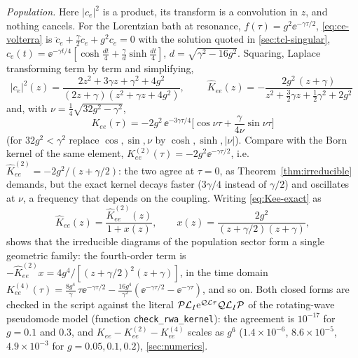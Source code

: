 \begin{exbox}
\smallskip\noindent\emph{Population.}
Here $|c_e|^2$ is a product, its transform is a convolution in $z$, and nothing cancels.
For the Lorentzian bath at resonance, $f(\tau)=g^2\ee^{-\gamma\tau/2}$, \cref{eq:ce-volterra} is $\ddot c_e+\tfrac\gamma2\dot c_e+g^2c_e=0$ with the solution quoted in \cref{sec:tcl-singular}, $c_e(t)=\ee^{-\gamma t/4}[\cosh\tfrac{dt}4+\tfrac\gamma d\sinh\tfrac{dt}4]$, $d=\sqrt{\gamma^2-16g^2}$.
Squaring, Laplace transforming term by term and simplifying,
\begin{equation}
  \widehat{|c_e|^2}(z)=\frac{2z^2+3\gamma z+\gamma^2+4g^2}{(2z+\gamma)(z^2+\gamma z+4g^2)},
  \qquad
  \boxed{\;\hat K_{ee}(z)=-\frac{2g^2\,(z+\gamma)}{z^2+\tfrac32\gamma z+\tfrac12\gamma^2+2g^2}\;}
  \label{eq:Kee-exact}
\end{equation}
and, with $\nu=\tfrac14\sqrt{32g^2-\gamma^2}$,
\begin{equation}
  K_{ee}(\tau)=-2g^2\,\ee^{-3\gamma\tau/4}\Big[\cos\nu\tau+\frac{\gamma}{4\nu}\sin\nu\tau\Big]
  \label{eq:Kee-exact-t}
\end{equation}
(for $32g^2<\gamma^2$ replace $\cos,\sin,\nu$ by $\cosh,\sinh,|\nu|$).
Compare with the Born kernel of the same element, $K^{(2)}_{ee}(\tau)=-2g^2\ee^{-\gamma\tau/2}$, i.e.\ $\hat K^{(2)}_{ee}=-2g^2/(z+\gamma/2)$: the two agree at $\tau=0$, as Theorem~\ref{thm:irreducible} demands, but the exact kernel decays faster ($3\gamma/4$ instead of $\gamma/2$) and oscillates at $\nu$, a frequency that depends on the coupling.
Writing \cref{eq:Kee-exact} as
\begin{equation}
  \hat K_{ee}(z)=\frac{\hat K^{(2)}_{ee}(z)}{1+x(z)},\qquad x(z)=\frac{2g^2}{(z+\gamma/2)(z+\gamma)},
  \label{eq:Kee-geometric}
\end{equation}
shows that the irreducible diagrams of the population sector form a single geometric family: the fourth-order term is $-\hat K^{(2)}_{ee}x=4g^4/[(z+\gamma/2)^2(z+\gamma)]$, in the time domain $K^{(4)}_{ee}(\tau)=\tfrac{8g^4}\gamma\,\tau\ee^{-\gamma\tau/2}-\tfrac{16g^4}{\gamma^2}(\ee^{-\gamma\tau/2}-\ee^{-\gamma\tau})$, and so on.
Both closed forms are checked in the script against the literal $\mathcal{P}\mathcal{L}_I\mathrm{e}^{\mathcal{Q}\mathcal{L}\tau}\mathcal{Q}\mathcal{L}_I\mathcal{P}$ of the rotating-wave pseudomode model (function \texttt{check\_rwa\_kernel}): the agreement is $10^{-17}$ for $g=0.1$ and $0.3$, and $K_{ee}-K^{(2)}_{ee}-K^{(4)}_{ee}$ scales as $g^6$ ($1.4\times10^{-6}$, $8.6\times10^{-5}$, $4.9\times10^{-3}$ for $g=0.05,0.1,0.2$), \cref{sec:numerics}.
\end{exbox}

